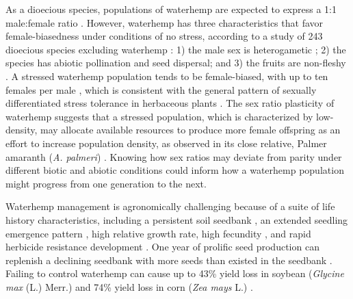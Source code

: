 \documentclass[
]{article}
\begin{document}
As a dioecious species, populations of waterhemp are expected to express a 1:1 male:female ratio \citep{grantCytogeneticStudiesAmaranthus1959, costeaBiologyInvasiveAlien2005, heneghanGrowthDevelopmentFive2017}. However, waterhemp has three characteristics that favor female-biasedness under conditions of no stress, according to a study of 243 dioecious species excluding waterhemp \citep{fieldComparativeAnalysesSexratio2013}: 1) the male sex is heterogametic \citep{montgomeryMaleSpecificChromosomal2021}; 2) the species has abiotic pollination and seed dispersal; and 3) the fruits are non-fleshy \citep{costeaBiologyInvasiveAlien2005}. A stressed waterhemp population tends to be female-biased, with up to ten females per male \citep{prattAmaranthusRudisTuberculatus2001}, which is consistent with the general pattern of sexually differentiated stress tolerance in herbaceous plants \citep[38 species, excluding waterhemp,][]{juvanySexrelatedDifferencesStress2015}. The sex ratio plasticity of waterhemp suggests that a stressed population, which is characterized by low-density, may allocate available resources to produce more female offspring as an effort to increase population density, as observed in its close relative, Palmer amaranth (\emph{A. palmeri}) \citep{korresPalmerAmaranthAmaranthus2017, mesgaranSexLabilityDimorphism2019}. Knowing how sex ratios may deviate from parity under different biotic and abiotic conditions could inform how a waterhemp population might progress from one generation to the next.

Waterhemp management is agronomically challenging because of a suite of life history characteristics, including a persistent soil seedbank \citep{davisWeedSeedPools2008}, an extended seedling emergence pattern \citep{buhlerEmergencePersistenceSeed2001}, high relative growth rate, high fecundity \citep{heneghanGrowthDevelopmentFive2017}, and rapid herbicide resistance development \citep{tranelHerbicideResistanceAmaranthus2021}. One year of prolific seed production can replenish a declining seedbank with more seeds than existed in the seedbank \citep{davisWeedSeedPools2008}. Failing to control waterhemp can cause up to 43\% yield loss in soybean (\emph{Glycine max} (L.) Merr.) \citep{hagerCommonWaterhempAmaranthus2002a} and 74\% yield loss in corn (\emph{Zea mays} L.) \citep{steckelCommonWaterhempAmaranthus2004}.
\end{document}
